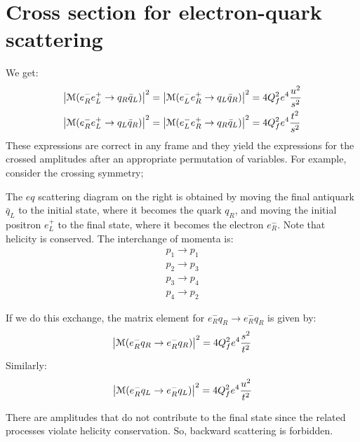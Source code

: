 \documentclass[../../main/main.tex]{subfiles}
\begin{document}
\section{Cross section for electron-quark scattering}
We get:
\begin{align}
	\abs{\mathcal{M}(e^-_R e^+_L \rightarrow q_R \bar{q}_L)}^2
	&=
	\abs{\mathcal{M}(e^-_L e^+_R \rightarrow q_L \bar{q}_R)}^2
	=
	4 Q^2_f e^4 \frac{u^2}{s^2}
	\\
	\abs{\mathcal{M}(e^-_R e^+_L \rightarrow q_L \bar{q}_R)}^2
	&=
	\abs{\mathcal{M}(e^-_L e^+_R \rightarrow q_R \bar{q}_L)}^2
	=
	4 Q^2_f e^4 \frac{t^2}{s^2}
\end{align}
These expressions are correct in any frame and they yield the expressions for the crossed amplitudes after an appropriate permutation of variables. For example, consider the crossing symmetry;

The \( eq \) scattering diagram on the right is obtained by moving the final antiquark \( \bar{q}_L \) to the initial state, where it becomes the quark \( q_R \), and moving the initial positron \( e^+_L \) to the final state, where it becomes the electron \( e^-_R \). Note that helicity is conserved. The interchange of momenta is:
\begin{equation}
	\begin{gathered}
		p_1 \longrightarrow p_1	\\
		p_2 \longrightarrow p_3	\\
		p_3 \longrightarrow p_4	\\
		p_4 \longrightarrow p_2
	\end{gathered}
	\label{eq:}
\end{equation}

If we do this exchange, the matrix element for \( e^-_Rq_R \longrightarrow e^-_Rq_R \) is given by:
\begin{equation}
	\abs{\mathcal{M}(e^-_Rq_R \rightarrow e^-_Rq_R)}^2
	=
	4 Q^2_f e^4 \frac{s^2}{t^2}
	\label{eq:}
\end{equation}
Similarly:
\begin{equation}
	\abs{\mathcal{M}(e^-_Rq_L \rightarrow e^-_Rq_L)}^2
	=
	4 Q^2_f e^4 \frac{u^2}{t^2}
	\label{eq:}
\end{equation}

There are amplitudes that do not contribute to the final state since the related processes violate helicity conservation. So, backward scattering is forbidden.
\end{document}
